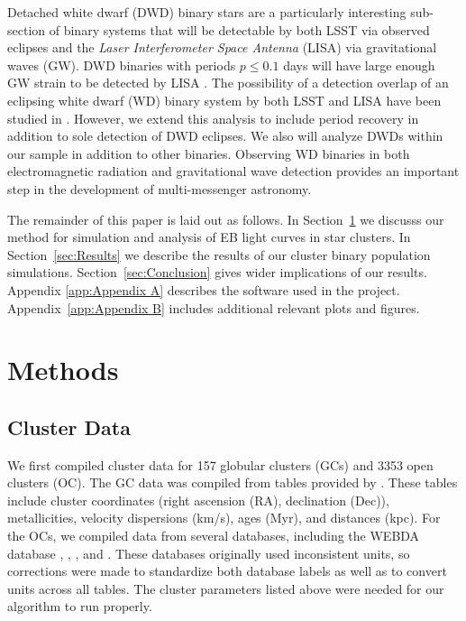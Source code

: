 \documentclass[twocolumn]{aastex63}
\begin{document}
Detached white dwarf (DWD) binary stars are a particularly interesting sub-section of binary systems that will be detectable by both LSST via observed eclipses and the \textit{Laser Interferometer Space Antenna} (LISA) via gravitational waves (GW). DWD binaries with periods $p \leq 0.1$ days will have large enough GW strain to be detected by LISA \citep{2017MNRAS.470.1894K}. The possibility of a detection overlap of an eclipsing white dwarf (WD) binary system by both LSST and LISA have been studied in \citet{2017MNRAS.470.1894K}. However, we extend this analysis to include period recovery in addition to sole detection of DWD eclipses. We also will analyze DWDs within our sample in addition to other binaries. Observing WD binaries in both electromagnetic radiation and gravitational wave detection provides an important step in the development of multi-messenger astronomy.

The remainder of this paper is laid out as follows. In Section~\ref{sec:Methods} we discusss our method for simulation and analysis of EB light curves in star clusters. In Section~\ref{sec:Results} we describe the results of our cluster binary population simulations. Section~\ref{sec:Conclusion} gives wider implications of our results. Appendix \ref{app:Appendix A} describes the software used in the project.
Appendix~\ref{app:Appendix B} includes additional relevant plots and figures.


\section{Methods} \label{sec:Methods}

\subsection{Cluster Data} \label{sec:compiling}

We first compiled cluster data for 157 globular clusters (GCs) and 3353 open clusters (OC). The GC data was compiled from tables provided by \citet{1996AJ....112.1487H}. These tables include cluster coordinates (right ascension (RA), declination (Dec)), metallicities, velocity dispersions (km/s), ages (Myr), and distances (kpc). For the OCs, we compiled data from several databases, including the WEBDA database \citep{1995MNRAS.275..828M}, \citet{2013A&A...558A..53K}, \citet{2004A&A...414..163S}, and \citet{2008A&A...477..165P}. These databases originally used inconsistent units, so corrections were made to standardize both database labels as well as to convert units across all tables. The cluster parameters listed above were needed for our algorithm to run properly.
\end{document}
